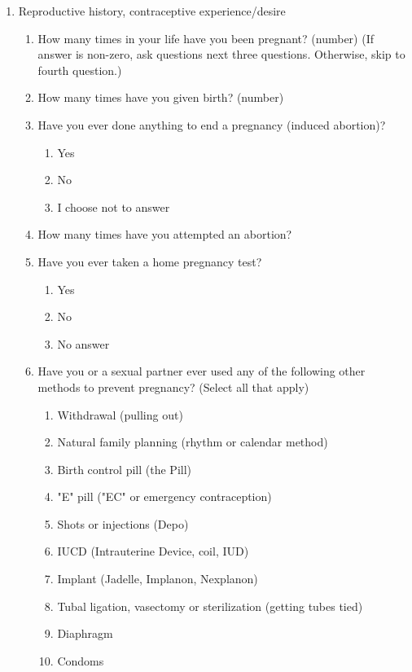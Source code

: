 \begin{enumerate}
    \item Reproductive history, contraceptive experience/desire
    \begin{enumerate}
        \item How many times in your life have you been pregnant? (number) (If answer is non-zero, ask questions next three questions. Otherwise, skip to fourth question.)
        \item How many times have you given birth? (number)
        \item Have you ever done anything to end a pregnancy (induced abortion)?
            \begin{enumerate}
                \item Yes
                \item No
                \item I choose not to answer
            \end{enumerate}  
        \item How many times have you attempted an abortion?
        \item Have you ever taken a home pregnancy test?
            \begin{enumerate}
                \item Yes
                \item No
                \item No answer
            \end{enumerate}  
        \item Have you or a sexual partner ever used any of the following other methods to prevent pregnancy? (Select all that apply)
        \begin{enumerate}
            \item Withdrawal (pulling out)
            \item Natural family planning (rhythm or calendar method)
            \item Birth control pill (the Pill)
            \item "E" pill ("EC" or emergency contraception)
            \item Shots or injections (Depo)
            \item IUCD (Intrauterine Device, coil, IUD)
            \item Implant (Jadelle, Implanon, Nexplanon)
            \item Tubal ligation, vasectomy or sterilization (getting tubes tied)
            \item Diaphragm
            \item Condoms

\end{enumerate}
\end{enumerate}
\end{enumerate}
